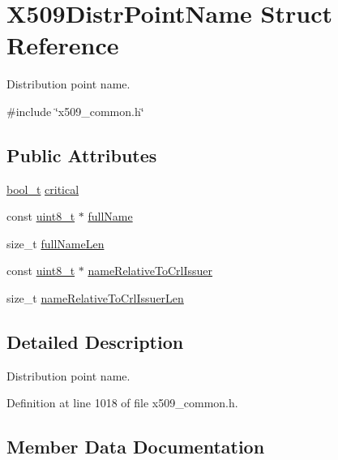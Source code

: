 \hypertarget{structX509DistrPointName}{}\section{X509\+Distr\+Point\+Name Struct Reference}
\label{structX509DistrPointName}


Distribution point name.  




{\ttfamily \#include \char`\"{}x509\+\_\+common.\+h\char`\"{}}

\subsection*{Public Attributes}
\begin{DoxyCompactItemize}
\item 
\hyperlink{compiler__port_8h_a812d16e5494522586b3784e55d479912}{bool\+\_\+t} \hyperlink{structX509DistrPointName_a04f0604e155541e6dd651aaf1162b44e}{critical}
\item 
const \hyperlink{stdint_8h_aba7bc1797add20fe3efdf37ced1182c5}{uint8\+\_\+t} $\ast$ \hyperlink{structX509DistrPointName_a896bf61f4876e588066efc3ed6662af3}{full\+Name}
\item 
size\+\_\+t \hyperlink{structX509DistrPointName_a5ec1c1e9b5d6ffbe8441ef704a19cf4a}{full\+Name\+Len}
\item 
const \hyperlink{stdint_8h_aba7bc1797add20fe3efdf37ced1182c5}{uint8\+\_\+t} $\ast$ \hyperlink{structX509DistrPointName_a489b4ab402a74d61fa69793850475e4d}{name\+Relative\+To\+Crl\+Issuer}
\item 
size\+\_\+t \hyperlink{structX509DistrPointName_ab920416677823c2955d5f0a346d0a906}{name\+Relative\+To\+Crl\+Issuer\+Len}
\end{DoxyCompactItemize}


\subsection{Detailed Description}
Distribution point name. 

Definition at line 1018 of file x509\+\_\+common.\+h.



\subsection{Member Data Documentation}
\mbox{\label{structX509DistrPointName_a04f0604e155541e6dd651aaf1162b44e}} 
